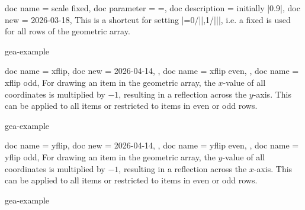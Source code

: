 \documentclass[a4paper,11pt]{article}
\begin{document}
\begin{docGeaKeys}
  {
    {
      doc name        = scale fixed,
      doc parameter   = {=},
      doc description = {initially |0.9|},
      doc new         = 2026-03-18,
    }
  }
  This is a shortcut for setting
  |={0/||,1/||}|,
  i.e. a fixed  is used for all rows of the geometric array.
\begin{dispExample*}{gea-example}
\end{dispExample*}
\end{docGeaKeys}

\clearpage

\begin{docGeaKeys}
  [
      doc key choices* = {true,false},
      doc description  = {default \texttt{true}, initially \texttt{false}},
  ]
  {
    {
      doc name        = xflip,
      doc new         = 2026-04-14,
    },
    {
      doc name        = xflip even,
    },
    {
      doc name        = xflip odd,
    }
  }
  For drawing an item in the geometric array, the $x$-value of all coordinates is
  multiplied by $-1$, resulting in a reflection across the $y$-axis. This can be
  applied to all items or restricted to items in even or odd rows.
\begin{dispExample*}{gea-example}
\end{dispExample*}
\end{docGeaKeys}


\begin{docGeaKeys}
  [
      doc key choices* = {true,false},
      doc description  = {default \texttt{true}, initially \texttt{false}},
  ]
  {
    {
      doc name        = yflip,
      doc new         = 2026-04-14,
    },
    {
      doc name        = yflip even,
    },
    {
      doc name        = yflip odd,
    }
  }
  For drawing an item in the geometric array, the $y$-value of all coordinates is
  multiplied by $-1$, resulting in a reflection across the $x$-axis. This can be
  applied to all items or restricted to items in even or odd rows.
\begin{dispExample*}{gea-example}
\end{dispExample*}
\end{docGeaKeys}
\end{document}
